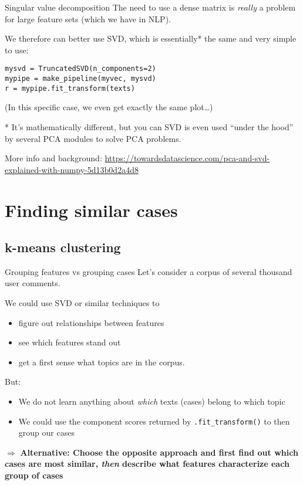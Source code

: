 \documentclass[compress]{beamer}
\begin{document}
\begin{frame}[fragile]{Singular value decomposition}
The need to use a dense matrix is \emph{really} a problem for large feature sets (which we have in NLP).
\pause

We therefore can better use SVD, which is essentially* the same and very simple to use:

\begin{lstlisting}
mysvd = TruncatedSVD(n_components=2)
mypipe = make_pipeline(myvec, mysvd)
r = mypipe.fit_transform(texts)
\end{lstlisting}

\footnotesize{(In this specific case, we even get exactly the same plot\ldots)}


\footnotesize{
* It's mathematically different, but you can SVD is even used ``under the hood'' by several PCA modules to solve PCA problems.

More info and background: \url{https://towardsdatascience.com/pca-and-svd-explained-with-numpy-5d13b0d2a4d8}}

\end{frame}







\section{Finding similar cases}

\subsection{k-means clustering}




\begin{frame}{Grouping features vs grouping cases}
Let's consider a corpus of several thousand user comments.

We could use SVD or similar techniques to 
\begin{itemize}
\item figure out relationships between features
\item see which features stand out
\item get a first sense what topics are in the corpus.
\end{itemize}
\pause

But:
\begin{itemize}
\item<+-> We do not learn anything about \emph{which} texts (cases) belong to which topic
\item<+-> We could use the component scores returned by \texttt{.fit\_transform()} to then group our cases
\end{itemize}

\pause 
$\Rightarrow$ \textbf{Alternative: Choose the opposite approach and first find out which cases are most similar, \textit{then} describe what features characterize each group of cases}


\end{frame}
\end{document}
